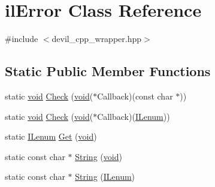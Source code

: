 \hypertarget{classil_error}{\section{il\-Error Class Reference}
\label{classil_error}
}


{\ttfamily \#include $<$devil\-\_\-cpp\-\_\-wrapper.\-hpp$>$}

\subsection*{Static Public Member Functions}
\begin{DoxyCompactItemize}
\item 
static \hyperlink{il_8h_a5530e04d947bcddd83639ea7940faf10}{void} \hyperlink{classil_error_acb37f3d97626f17d5a619611882dc5b8}{Check} (\hyperlink{il_8h_a5530e04d947bcddd83639ea7940faf10}{void}($\ast$Callback)(const char $\ast$))
\item 
static \hyperlink{il_8h_a5530e04d947bcddd83639ea7940faf10}{void} \hyperlink{classil_error_afe7985f1fbbf6165bef5edcf9b7dec24}{Check} (\hyperlink{il_8h_a5530e04d947bcddd83639ea7940faf10}{void}($\ast$Callback)(\hyperlink{il_8h_a1542f3a70c0c5370a30a1fa5ce349e2d}{I\-Lenum}))
\item 
static \hyperlink{il_8h_a1542f3a70c0c5370a30a1fa5ce349e2d}{I\-Lenum} \hyperlink{classil_error_a4f417425373735ca2bfc3e5e25d94fad}{Get} (\hyperlink{il_8h_a5530e04d947bcddd83639ea7940faf10}{void})
\item 
static const char $\ast$ \hyperlink{classil_error_ab58654f54e234ed7f51d07dc0b60cae2}{String} (\hyperlink{il_8h_a5530e04d947bcddd83639ea7940faf10}{void})
\item 
static const char $\ast$ \hyperlink{classil_error_aa7c2095b1c3c407c14d32e44a059bfee}{String} (\hyperlink{il_8h_a1542f3a70c0c5370a30a1fa5ce349e2d}{I\-Lenum})
\end{DoxyCompactItemize}


